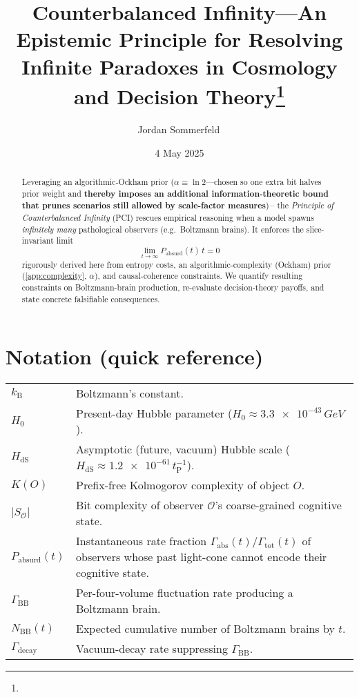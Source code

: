 \documentclass[12pt]{article}
\title{Counterbalanced Infinity—An Epistemic Principle for Resolving Infinite Paradoxes in Cosmology and Decision Theory\thanks{\DOI}}
\author{Jordan Sommerfeld\,\orcidlink{0009-0005-4658-4085}}
\date{4 May 2025}
\newcommand{\KB}{k_\mathrm{B}}
\newcommand{\PCI}{PCI\xspace}
\begin{document}
\raggedbottom
\maketitle

\begin{abstract}\noindent
Leveraging an algorithmic‐Ockham prior
($\alpha\equiv\ln 2$—chosen so one extra bit halves prior weight and \textbf{thereby imposes an additional information-theoretic bound that prunes scenarios still allowed by scale-factor measures})\,– the \emph{Principle of Counterbalanced Infinity} (\PCI) rescues empirical
reasoning when a model spawns \emph{infinitely many} pathological observers (e.g.\ Boltzmann brains). It enforces the slice-invariant limit
\[
   \lim_{t\to\infty} P_{\text{absurd}}(t)\,t = 0
   \tag*{\PCI Limit}\label{eq:PCI-limit}
\]
rigorously derived here from entropy costs, an algorithmic-complexity (Ockham) prior
(\autoref{app:complexity}, $\alpha$), and causal-coherence constraints. We quantify resulting constraints on Boltzmann-brain production,
re-evaluate decision-theory payoffs, and state concrete falsifiable consequences.
\enlargethispage{\baselineskip}
\end{abstract}

\section*{Notation (quick reference)}
\renewcommand{\arraystretch}{1.2}
\begin{tabular}{@{}p{3.3cm}p{10cm}@{}}
$\KB$ & Boltzmann’s constant.\\
$H_0$ & Present-day Hubble parameter ($H_0\!\approx\!\num{3.3e-43}\,\si{GeV}$).\\
$H_{\mathrm{dS}}$ & Asymptotic (future, vacuum) Hubble scale
($H_{\mathrm{dS}}\!\approx\!\num{1.2e-61}\,t_{\mathrm P}^{-1}$).\\
$K(O)$ & Prefix-free Kolmogorov complexity of object $O.$\\
$\lvert S_{\mathcal O}\rvert$ & Bit complexity of observer $\mathcal O$’s coarse-grained cognitive state.\\
$P_{\text{absurd}}(t)$ & Instantaneous rate fraction $\Gamma_{\text{abs}}(t)/\Gamma_{\text{tot}}(t)$ of observers whose past light-cone cannot encode their cognitive state.\\
$\Gamma_{\text{BB}}$ & Per-four-volume fluctuation rate producing a Boltzmann brain.\\
$N_{\text{BB}}(t)$ & Expected cumulative number of Boltzmann brains by $t.$\\
$\Gamma_{\text{decay}}$ & Vacuum-decay rate suppressing $\Gamma_{\text{BB}}.$\\
\end{tabular}
\end{document}
